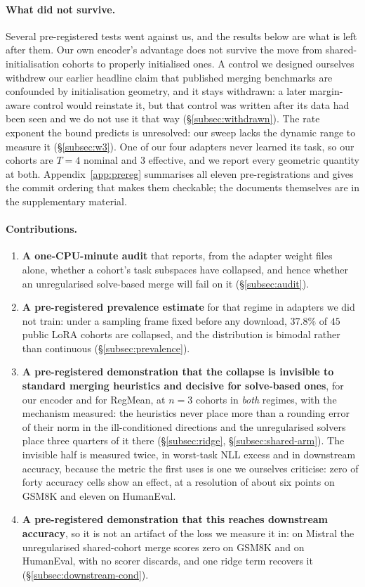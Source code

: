 \paragraph{What did not survive.} Several pre-registered tests went against
us, and the results below are what is left after them. Our own encoder's
advantage does not survive the move from shared-initialisation cohorts to
properly initialised ones. A control we designed ourselves withdrew our
earlier headline claim that published merging benchmarks are confounded by
initialisation geometry, and it stays withdrawn: a later margin-aware
control would reinstate it, but that control was written after its data had
been seen and we do not use it that way (\S\ref{subsec:withdrawn}). The rate exponent the bound predicts is unresolved:
our sweep lacks the dynamic range to measure it (\S\ref{subsec:w3}). One of our four adapters never learned its
task, so our cohorts are $T=4$ nominal and $3$ effective, and we report
every geometric quantity at both. Appendix~\ref{app:prereg} summarises all
eleven pre-registrations and gives the commit ordering that makes them
checkable;
the documents themselves are in the supplementary material.

\paragraph{Contributions.}
\begin{enumerate}
\item \textbf{A one-CPU-minute audit} that reports, from the adapter weight
  files alone, whether a cohort's task subspaces have collapsed, and hence
  whether an unregularised solve-based merge will fail on it
  (\S\ref{subsec:audit}).
\item \textbf{A pre-registered prevalence estimate} for that regime in
  adapters we did not train: under a sampling frame fixed before any
  download, $37.8\%$ of $45$ public LoRA cohorts are collapsed, and the
  distribution is bimodal rather than continuous
  (\S\ref{subsec:prevalence}).
\item \textbf{A pre-registered demonstration that the collapse is invisible
  to standard merging heuristics and decisive for solve-based ones}, for
  our encoder and for RegMean, at $n = 3$ cohorts in \emph{both} regimes,
  with the mechanism measured: the heuristics never place more than a
  rounding error of their norm in the ill-conditioned directions and the
  unregularised solvers place three quarters of it there
  (\S\ref{subsec:ridge}, \S\ref{subsec:shared-arm}). The invisible half
  is measured twice, in worst-task NLL excess and in downstream accuracy,
  because the metric the first uses is one we ourselves criticise: zero of
  forty accuracy cells show an effect, at a resolution of about six points
  on GSM8K and eleven on HumanEval.
\item \textbf{A pre-registered demonstration that this reaches downstream
  accuracy}, so it is not an artifact of the loss we measure it in: on
  Mistral the unregularised shared-cohort merge scores zero on GSM8K and on
  HumanEval, with no scorer discards, and one ridge term recovers it
  (\S\ref{subsec:downstream-cond}).
\end{enumerate}

